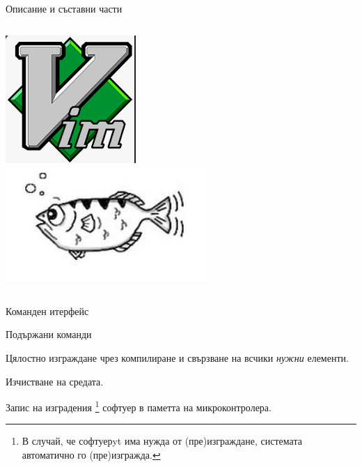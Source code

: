 \documentclass[handout]{beamer}
\begin{document}
\begin{frame}{Описание и съставни части}
\begin{columns}
			\includegraphics[width=0.95\linewidth]{Images/vim.png}\\[0.5em]
			\includegraphics[width=0.95\linewidth]{Images/gdb.png}
	\end{columns}
\end{frame}

\begin{frame}{Команден итерфейс}

	\begin{block}{Подържани команди }
	\begin{description}
		\pause
		\item[make | make all] Цялостно изграждане чрез компилиране и свързване на всчики \emph{нужни} елементи.

		\pause
		\item[make clean] Изчистване на средата.

		\pause
		\item[make flash] Запис на изградения
		\footnote{В случай, че софтуерyt има нужда от (пре)изграждане, системата автоматично го (пре)изгражда.}
		софтуер в паметта на микроконтролера.

	\end{description}
	\end{block}
\end{frame}
\end{document}
